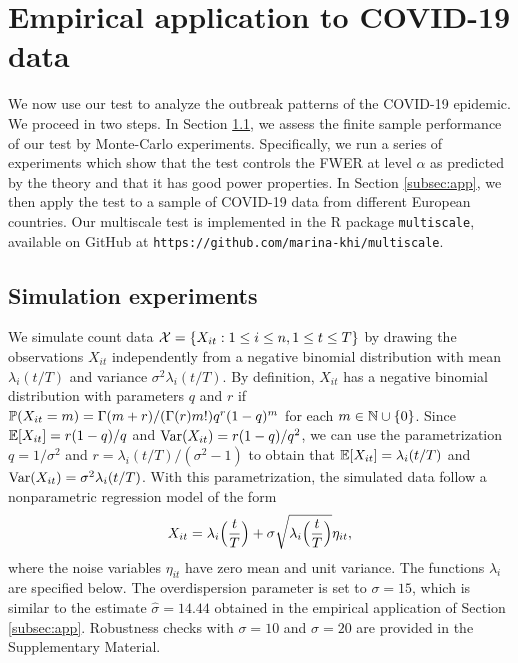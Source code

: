 \documentclass[a4paper,12pt]{article}
\numberwithin{equation}{section}
\begin{document}
\section{Empirical application to COVID-19 data}\label{sec:empirics} 


We now use our test to analyze the outbreak patterns of the COVID-19 epidemic. We proceed in two steps. In Section \ref{subsec:sim}, we assess the finite sample performance of our test by Monte-Carlo experiments. Specifically, we run a series of experiments which show that the test controls the FWER at level $\alpha$ as predicted by the theory and that it has good power properties. In Section \ref{subsec:app}, we then apply the test to a sample of COVID-19 data from different European countries. Our multiscale test is implemented in the R package \verb|multiscale|, available on GitHub at \texttt{https://github.com/marina-khi/multiscale}.


\subsection{Simulation experiments}\label{subsec:sim}


We simulate count data $\mathcal{X} = \{ X_{it}: 1 \le i \le n, 1 \le t \le T \}$ by drawing the observations $X_{it}$ independently from a negative binomial distribution with mean $\lambda_i(t/T)$ and variance $\sigma^2 \lambda_i(t/T)$. By definition, $X_{it}$ has a negative binomial distribution with para\-meters $q$ and $r$ if $\mathbb{P}(X_{it} = m) = \Gamma(m+r) / (\Gamma(r) m!) q^r (1-q)^m$ for each $m \in \mathbb{N} \cup \{0\}$. Since $\mathbb{E}[X_{it}] = r (1-q)/q$ and $\textnormal{Var}(X_{it}) = r(1-q)/q^2$, we can use the parametrization $q = 1/\sigma^2$ and $r = \lambda_i(t/T) / (\sigma^2 - 1)$ to obtain that $\mathbb{E}[X_{it}] = \lambda_i(t/T)$ and $\textnormal{Var}(X_{it}) = \sigma^2 \lambda_i(t/T)$. With this parametrization, the simulated data follow a nonparametric regression model of the form 
\[ X_{it} = \lambda_i\Big(\frac{t}{T}\Big) + \sigma \sqrt{\lambda_i\Big(\frac{t}{T}\Big)} \eta_{it}, \]
where the noise variables $\eta_{it}$ have zero mean and unit variance. The functions $\lambda_i$ are specified below. The overdispersion parameter is set to $\sigma = 15$, which is similar to the estimate $\hat{\sigma} = 14.44$ obtained in the empirical application of Section \ref{subsec:app}. Robustness checks with $\sigma=10$ and $\sigma=20$ are provided in the Supplementary Material.
\end{document}
